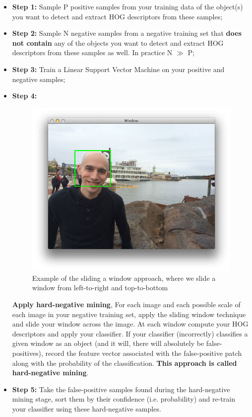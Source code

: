         \begin{itemize}
            \item \textbf{Step 1:} Sample P positive samples from your training data of the object(s) you want to detect and extract HOG descriptors from these samples;
            \item \textbf{Step 2:} Sample N negative samples from a negative training set that \textbf{does not contain} any of the objects you want to detect and extract HOG descriptors from these samples as well. In practice N $\gg$ P;
            \item \textbf{Step 3:} Train a Linear Support Vector Machine on your positive and negative samples;
            \item \textbf{Step 4:} 
                \begin{figure}[H]
                    \centering
                    \includegraphics[width=0.6\linewidth]{img/sliding_window_example.jpg}
                    \caption{Example of the sliding a window approach, where we slide a window from left-to-right and top-to-bottom}
                \end{figure}
                \textbf{Apply hard-negative mining}, For each image and each possible scale of each image in your negative training set, apply the sliding window technique and slide your window across the image. 
                At each window compute your HOG descriptors and apply your classifier. If your classifier (incorrectly) classifies a given window as an object (and it will, there will absolutely be false-positives), 
                record the feature vector associated with the false-positive patch along with the probability of the classification. \textbf{This approach is called hard-negative mining}.
            \item \textbf{Step 5:} Take the false-positive samples found during the hard-negative mining stage, sort them by their confidence (i.e. probability) and re-train your classifier using these hard-negative samples.

\end{itemize}
